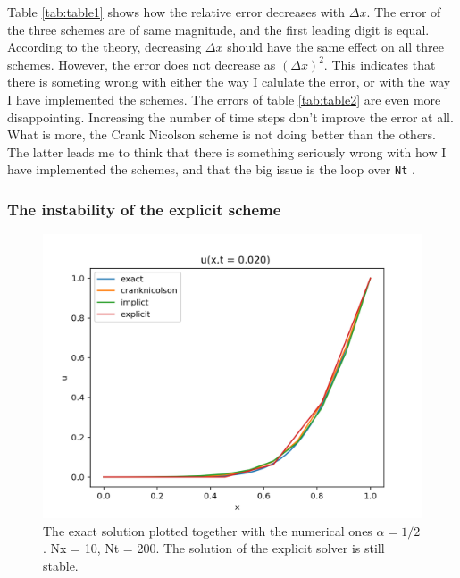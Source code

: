 \documentclass{article}
\begin{document}
Table \ref{tab:table1} shows how the relative error decreases with $\Delta x$. The error of the three schemes are of same magnitude, and the first leading digit is equal. According to the theory, decreasing $\Delta x$ should have the same effect on all three schemes. However, the error does not decrease as $(\Delta x)^2$. This indicates that there is someting wrong with either the way I calulate the error, or with the way I have implemented the schemes. The errors of table \ref{tab:table2} are even more disappointing. Increasing the number of time steps don't improve the error at all. What is more, the Crank Nicolson scheme is not doing better than the others. The latter leads me to think that there is something seriously wrong with how I have implemented the schemes, and that the big issue is the loop over \texttt{Nt} .
\subsubsection{The instability of the explicit scheme}

\begin{figure}
  \includegraphics[width=\linewidth]{Nt200Nx10t02.png}
  \caption{The exact solution plotted together with the numerical ones $\alpha =1/2$. Nx = 10, Nt = 200. The solution of the explicit solver is still stable.}
  \label{fig:Nt200Nx10t02}
\end{figure} 
\end{document}
